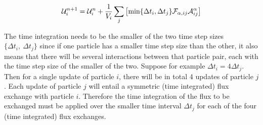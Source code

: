 \begin{align}
\mathcal{U}_i^{n+1} =
    \mathcal{U}_i^n + \frac{1}{V_i} \sum_j \left[
    \min\{ \Delta t_i, \Delta t_j \} \mathcal{F}_{\alpha, ij} \mathcal{A}_{ij}^\alpha
    \right]
\label{eq:meshless-explicit-individual-timesteps}
\end{align}

The time integration needs to be the smaller of the two time step sizes $\{\Delta t_i,\  \Delta
t_j\}$ since if one particle has a smaller time step size than the other, it also means that there
will be several interactions between that particle pair, each with the time step size of the smaller
of the two. Suppose for example $\Delta t_i = 4 \Delta t_j$. Then for a single update of particle
$i$, there will be in total 4 updates of particle $j$. Each update of particle $j$ will entail a
symmetric (time integrated) flux exchange with particle $i$. Therefore the time integration of the
flux to be exchanged must be applied over the smaller time interval $\Delta t_j$ for each of
the four (time integrated) flux exchanges.




